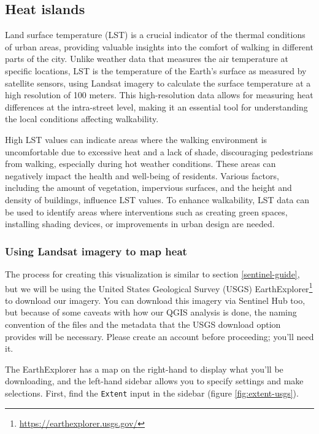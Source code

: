 \documentclass[
]{latex/krantz}
\renewcommand{\href}[2]{#2\footnote{\url{#1}}}
\DeclareRobustCommand{\href}[2]{#2\footnote{\url{#1}}}
\begin{document}
\hypertarget{heat-islands}{%
\subsection{Heat islands}\label{heat-islands}}

Land surface temperature (LST) is a crucial indicator of the thermal conditions of urban areas, providing valuable insights into the comfort of walking in different parts of the city. Unlike weather data that measures the air temperature at specific locations, LST is the temperature of the Earth's surface as measured by satellite sensors, using Landsat imagery to calculate the surface temperature at a high resolution of 100 meters. This high-resolution data allows for measuring heat differences at the intra-street level, making it an essential tool for understanding the local conditions affecting walkability.

High LST values can indicate areas where the walking environment is uncomfortable due to excessive heat and a lack of shade, discouraging pedestrians from walking, especially during hot weather conditions. These areas can negatively impact the health and well-being of residents. Various factors, including the amount of vegetation, impervious surfaces, and the height and density of buildings, influence LST values. To enhance walkability, LST data can be used to identify areas where interventions such as creating green spaces, installing shading devices, or improvements in urban design are needed.

\hypertarget{using-landsat-imagery-to-map-heat}{%
\subsubsection{Using Landsat imagery to map heat}\label{using-landsat-imagery-to-map-heat}}

The process for creating this visualization is similar to section \ref{sentinel-guide}, but we will be using the United States Geological Survey (USGS) \href{https://earthexplorer.usgs.gov/}{EarthExplorer} to download our imagery. You can download this imagery via Sentinel Hub too, but because of some caveats with how our QGIS analysis is done, the naming convention of the files and the metadata that the USGS download option provides will be necessary. Please create an account before proceeding; you'll need it.

The EarthExplorer has a map on the right-hand to display what you'll be downloading, and the left-hand sidebar allows you to specify settings and make selections. First, find the \texttt{Extent} input in the sidebar (figure \ref{fig:extent-usgs}).
\end{document}

